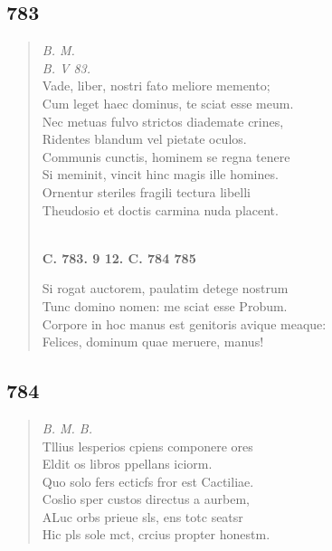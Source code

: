 \documentclass[11pt, a4paper]{report}
\begin{document}
            \subsection*{783}
      \begin{verse}
      \textit{B. M.} \\ \textit{B. V 83.} \\ Vade, liber, nostri fato meliore memento; \\ Cum leget haec dominus, te sciat esse meum. \\ Nec metuas fulvo strictos diademate crines, \\ Ridentes blandum vel pietate oculos. \\ Communis cunctis, hominem se regna tenere \\ Si meminit, vincit hinc magis ille homines. \\ Ornentur steriles fragili tectura libelli \\ Theudosio et doctis carmina nuda placent. \\ 
        ﻿\pagebreak 
    \begin{center} \textbf{C. 783. 9 12. C. 784 785} \end{center} \marginpar{[263]} Si rogat auctorem, paulatim detege nostrum \\ Tunc domino nomen: me sciat esse Probum. \\ Corpore in hoc manus est genitoris avique meaque: \\ Felices, dominum quae meruere, manus! \\ 
      \end{verse}
  
            \subsection*{784}
      \begin{verse}
      \textit{B. M. B.} \\ Tllius lesperios cpiens componere ores \\ Eldit os libros ppellans iciorm. \\ Quo solo fers ecticfs fror est Cactiliae. \\ Coslio sper custos directus a aurbem, \\ ALuc orbs prieue sls, ens totc seatsr \\ Hic pls sole mct, crcius propter honestm. \\ 
      \end{verse}
  
\end{document}
